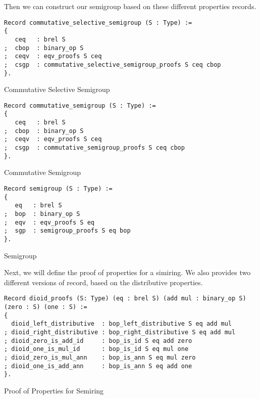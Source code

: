 Then we can construct our semigroup based on these different properties records.
\begin{listing}[H]
\begin{verbatim}
Record commutative_selective_semigroup (S : Type) :=
{
   ceq   : brel S      
;  cbop  : binary_op S
;  ceqv  : eqv_proofs S ceq               
;  csgp  : commutative_selective_semigroup_proofs S ceq cbop
}.
\end{verbatim}
\caption{Commutative Selective Semigroup} 
\label{coq:def:commutative_selective_semigroup}
\end{listing}

\begin{listing}[H]
\begin{verbatim}
Record commutative_semigroup (S : Type) :=
{
   ceq   : brel S      
;  cbop  : binary_op S
;  ceqv  : eqv_proofs S ceq               
;  csgp  : commutative_semigroup_proofs S ceq cbop
}.
\end{verbatim}
\caption{Commutative Semigroup} 
\label{coq:def:commutative_semigroup}
\end{listing}

\begin{listing}[H]
\begin{verbatim}
Record semigroup (S : Type) :=
{
   eq   : brel S      
;  bop  : binary_op S
;  eqv  : eqv_proofs S eq               
;  sgp  : semigroup_proofs S eq bop
}.
\end{verbatim}
\caption{Semigroup} 
\label{coq:def:semigroup}
\end{listing}

Next, we will define the proof of properties for a simiring. We also provides two different versions of record, based on the distributive properties.

\begin{listing}[H]
\begin{verbatim}
Record dioid_proofs (S: Type) (eq : brel S) (add mul : binary_op S) (zero : S) (one : S) :=
{  
  dioid_left_distributive  : bop_left_distributive S eq add mul
; dioid_right_distributive : bop_right_distributive S eq add mul
; dioid_zero_is_add_id     : bop_is_id S eq add zero
; dioid_one_is_mul_id      : bop_is_id S eq mul one                                                      
; dioid_zero_is_mul_ann    : bop_is_ann S eq mul zero
; dioid_one_is_add_ann     : bop_is_ann S eq add one
}.
\end{verbatim}
\caption{Proof of Properties for Semiring} 
\label{coq:def:dioid_proofs}
\end{listing}

